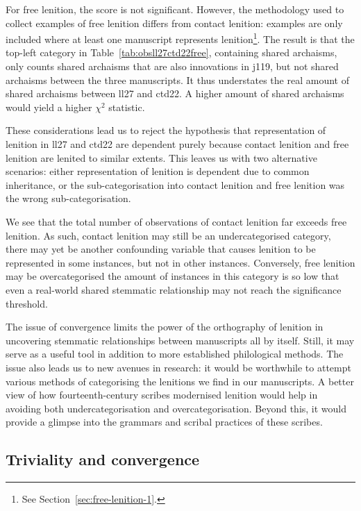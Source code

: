 For free lenition, the score is not significant. However, the methodology used to collect examples of free lenition differs from contact lenition: examples are only included where at least one manuscript represents lenition\footnote{See Section~\ref{sec:free-lenition-1}.}. The result is that the top-left category in Table~\ref{tab:obsll27ctd22free}, containing shared archaisms, only counts shared archaisms that are also innovations in \gls{j119}, but not shared archaisms between the three manuscripts. It thus understates the real amount of shared archaisms between \gls{ll27} and \gls{ctd22}. A higher amount of shared archaisms would yield a higher \(\chi^2\) statistic.

These considerations lead us to reject the hypothesis that representation of lenition in \gls{ll27} and \gls{ctd22} are dependent purely because contact lenition and free lenition are lenited to similar extents. This leaves us with two alternative scenarios: either representation of lenition is dependent due to common inheritance, or the sub-categorisation into contact lenition and free lenition was the wrong sub-categorisation.

We see that the total number of observations of contact lenition far exceeds free lenition. As such, contact lenition may still be an undercategorised category, \ie there may yet be another confounding variable that causes lenition to be represented in some instances, but not in other instances. Conversely, free lenition may be overcategorised \ie the amount of instances in this category is so low that even a real-world shared stemmatic relationship may not reach the significance threshold. 

The issue of convergence  limits the power of the orthography of lenition in uncovering stemmatic relationships between manuscripts all by itself. Still, it may serve as a useful tool in addition to more established philological methods. The issue also leads us to new avenues in research: it would be worthwhile to attempt various methods of categorising the lenitions we find in our manuscripts. A better view of how fourteenth-century scribes modernised lenition would help in avoiding both undercategorisation and overcategorisation. Beyond this, it would provide a glimpse into the grammars and scribal practices of these scribes.

\subsection{Triviality and convergence}
\label{sec:triv-conv}

